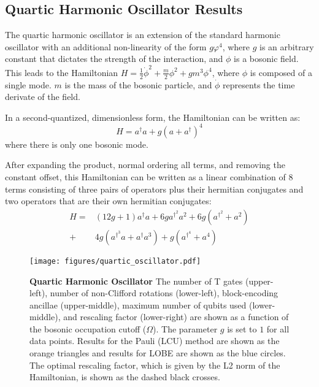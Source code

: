 \subsection{Quartic Harmonic Oscillator Results}
\label{sec:qosc_results}

The quartic harmonic oscillator \cite{PhysRev.184.1231, girguś2024spiralflowquantumquartic, wójcik2012applicationnumericalrenormalizationgroup} is an extension of the standard harmonic oscillator with an additional non-linearity of the form $g \varphi^4$, where $g$ is an arbitrary constant that dictates the strength of the interaction, and $\phi$ is a bosonic field.
This leads to the Hamiltonian $H = \frac12\dot\phi^2 + \frac{m}{2}\phi^2 + gm^3\phi^4 $, where $\phi$ is composed of a single mode.
$m$ is the mass of the bosonic particle, and $\dot \phi$ represents the time derivate of the field.

In a second-quantized, dimensionless form, the Hamiltonian can be written as:
\begin{equation}
    \label{eq:qosc}
    H = a^\dagger a + g\left(a + a^\dagger \right)^4
\end{equation}
where there is only one bosonic mode.

After expanding the product, normal ordering all terms, and removing the constant offset, this Hamiltonian can be written as a linear combination of $8$ terms consisting of three pairs of operators plus their hermitian conjugates and two operators that are their own hermitian conjugates:
\begin{equation}
    \begin{split}
        H = &(12g + 1) a^\dagger a + 6g a^{\dagger^2} a^2 + 6g \left(a^{\dagger^2} + a^2 \right) \\
        + &4g \left(a^{\dagger^3} a + a^\dagger a^3 \right) + g \left(a^{\dagger^4} + a^4 \right)
    \end{split}
\end{equation}

\begin{figure*}
    \label{fig:qosc}
    \texttt{[image: figures/quartic\_oscillator.pdf]}
    \caption{
        \textbf{Quartic Harmonic Oscillator}
        The number of T gates (upper-left), number of non-Clifford rotations (lower-left), block-encoding ancillae (upper-middle), maximum number of qubits used (lower-middle), and rescaling factor (lower-right) are shown as a function of the bosonic occupation cutoff ($\Omega$).
        The parameter $g$ is set to $1$ for all data points.
        Results for the Pauli (LCU) method are shown as the orange triangles and results for LOBE are shown as the blue circles.
        The optimal rescaling factor, which is given by the L2 norm of the Hamiltonian, is shown as the dashed black crosses.
    }
\end{figure*}

